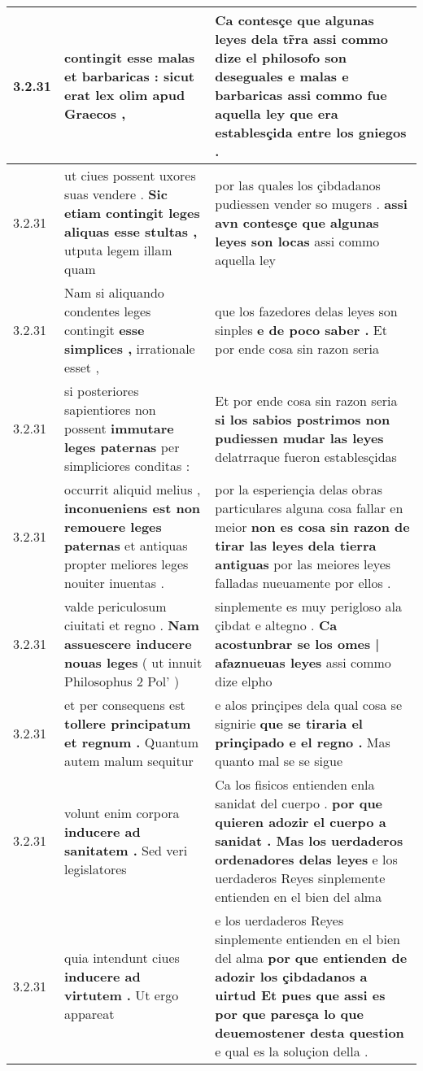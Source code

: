 \begin{tabular}{|p{1cm}|p{6.5cm}|p{6.5cm}|}
3.2.31 & contingit \textbf{ esse malas et barbaricas : } sicut erat lex olim apud Graecos , & Ca contesçe que algunas leyes dela tr̃ra \textbf{ assi commo dize el philosofo son deseguales e malas e barbaricas } assi commo fue aquella ley que era establesçida entre los gniegos . \\\hline
3.2.31 & ut ciues possent uxores suas vendere . \textbf{ Sic etiam contingit leges aliquas esse stultas , } utputa legem illam quam & por las quales los çibdadanos pudiessen vender so mugers . \textbf{ assi avn contesçe que algunas leyes son locas } assi commo aquella ley \\\hline
3.2.31 & Nam si aliquando condentes leges contingit \textbf{ esse simplices , } irrationale esset , & que los fazedores delas leyes son sinples \textbf{ e de poco saber . } Et por ende cosa sin razon seria \\\hline
3.2.31 & si posteriores sapientiores non possent \textbf{ immutare leges paternas } per simpliciores conditas : & Et por ende cosa sin razon seria \textbf{ si los sabios postrimos non pudiessen mudar las leyes } delatrraque fueron establesçidas \\\hline
3.2.31 & occurrit aliquid melius , \textbf{ inconueniens est non remouere leges paternas } et antiquas propter meliores leges nouiter inuentas . & por la esperiençia delas obras particulares alguna cosa fallar en meior \textbf{ non es cosa sin razon de tirar las leyes dela tierra antiguas } por las meiores leyes falladas nueuamente por ellos . \\\hline
3.2.31 & valde periculosum ciuitati et regno . \textbf{ Nam assuescere inducere nouas leges } ( ut innuit Philosophus 2 Pol’ ) & sinplemente es muy perigloso ala çibdat e altegno . \textbf{ Ca acostunbrar se los omes | afaznueuas leyes } assi commo dize elpho \\\hline
3.2.31 & et per consequens est \textbf{ tollere principatum et regnum . } Quantum autem malum sequitur & e alos prinçipes dela qual cosa se signirie \textbf{ que se tiraria el prinçipado e el regno . } Mas quanto mal se se sigue \\\hline
3.2.31 & volunt enim corpora \textbf{ inducere ad sanitatem . } Sed veri legislatores & Ca los fisicos entienden enla sanidat del cuerpo . \textbf{ por que quieren adozir el cuerpo a sanidat . Mas los uerdaderos ordenadores delas leyes } e los uerdaderos Reyes sinplemente entienden en el bien del alma \\\hline
3.2.31 & quia intendunt ciues \textbf{ inducere ad virtutem . } Ut ergo appareat & e los uerdaderos Reyes sinplemente entienden en el bien del alma \textbf{ por que entienden de adozir los çibdadanos a uirtud Et pues que assi es por que paresça lo que deuemostener desta question } e qual es la soluçion della . \\\hline

\end{tabular}
